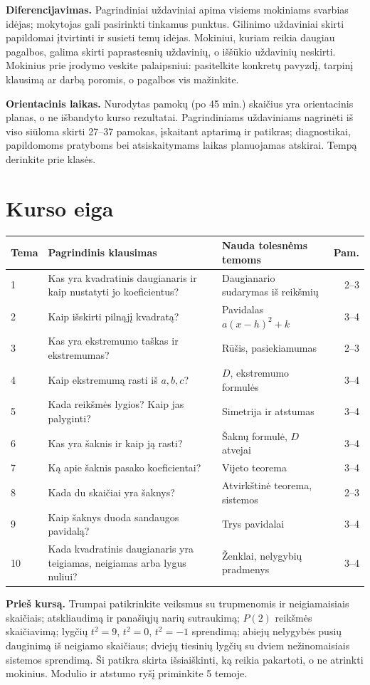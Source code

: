 \documentclass[11pt,a4paper]{article}
\begin{document}
\textbf{Diferencijavimas.} Pagrindiniai uždaviniai apima visiems mokiniams svarbias idėjas; mokytojas gali pasirinkti tinkamus punktus. Gilinimo uždaviniai skirti papildomai įtvirtinti ir susieti temų idėjas. Mokiniui, kuriam reikia daugiau pagalbos, galima skirti paprastesnių uždavinių, o iššūkio uždavinių neskirti. Mokinius prie įrodymo veskite palaipsniui: pasitelkite konkretų pavyzdį, tarpinį klausimą ar darbą poromis, o pagalbos vis mažinkite.

\textbf{Orientacinis laikas.} Nurodytas pamokų (po 45 min.) skaičius yra orientacinis planas, o ne išbandyto kurso rezultatai. Pagrindiniams uždaviniams nagrinėti iš viso siūloma skirti 27–37 pamokas, įskaitant aptarimą ir patikras; diagnostikai, papildomoms pratyboms bei atsiskaitymams laikas planuojamas atskirai. Tempą derinkite prie klasės.
\section*{Kurso eiga}
\small
\begin{longtable}{@{}p{}p{}p{}r@{}}\toprule
\textbf{Tema} & \textbf{Pagrindinis klausimas} & \textbf{Nauda tolesnėms temoms} & \textbf{Pam.}\\\midrule\endhead
1 & Kas yra kvadratinis daugianaris ir kaip nustatyti jo koeficientus? & Daugianario sudarymas iš reikšmių & 2–3\\
2 & Kaip išskirti pilnąjį kvadratą? & Pavidalas $a(x-h)^2+k$ & 3–4\\
3 & Kas yra ekstremumo taškas ir ekstremumas? & Rūšis, pasiekiamumas & 2–3\\
4 & Kaip ekstremumą rasti iš $a,b,c$? & $D$, ekstremumo formulės & 3–4\\
5 & Kada reikšmės lygios? Kaip jas palyginti? & Simetrija ir atstumas & 3–4\\
6 & Kas yra šaknis ir kaip ją rasti? & Šaknų formulė, $D$ atvejai & 3–4\\
7 & Ką apie šaknis pasako koeficientai? & Vijeto teorema & 3–4\\
8 & Kada du skaičiai yra šaknys? & Atvirkštinė teorema, sistemos & 2–3\\
9 & Kaip šaknys duoda sandaugos pavidalą? & Trys pavidalai & 3–4\\
10 & Kada kvadratinis daugianaris yra teigiamas, neigiamas arba lygus nuliui? & Ženklai, nelygybių pradmenys & 3–4\\\bottomrule
\end{longtable}
\normalsize
\textbf{Prieš kursą.} Trumpai patikrinkite veiksmus su trupmenomis ir neigiamaisiais skaičiais; atskliaudimą ir panašiųjų narių sutraukimą; $P(2)$ reikšmės skaičiavimą; lygčių $t^2=9$, $t^2=0$, $t^2=-1$ sprendimą; abiejų nelygybės pusių dauginimą iš neigiamo skaičiaus; dviejų tiesinių lygčių su dviem nežinomaisiais sistemos sprendimą. Ši patikra skirta išsiaiškinti, ką reikia pakartoti, o ne atrinkti mokinius. Modulio ir atstumo ryšį priminkite 5 temoje.
\end{document}
